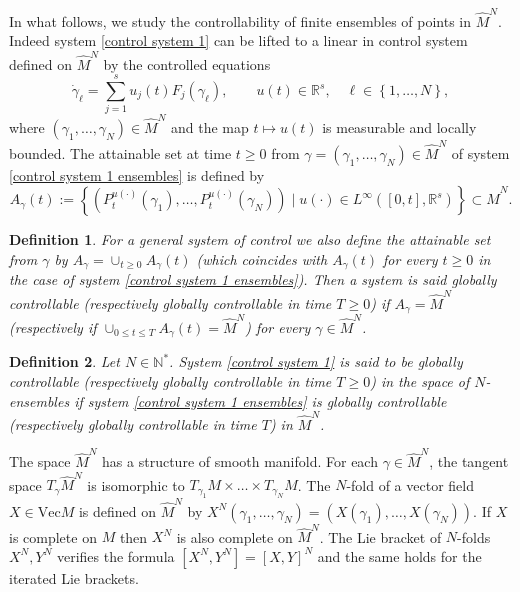 \documentclass[10pt]{article}
\newcommand{\R}{{\mathbb R}}
\newcommand{\N}{{\mathbb N}}
\newtheorem{definition}{Definition}
\begin{document}
In what follows, we study the controllability of finite ensembles of points in $\hat{M}^N$. Indeed system \eqref{control system 1} can be lifted to a linear in control system defined on $\hat{M}^N$ by the controlled equations
\begin{equation} \label{control system 1 ensembles}
    \dot{\gamma}_\ell=\sum_{j=1}^s u_j(t)F_j(\gamma_\ell), \qquad u(t)\in \R^s,\quad \ell \in \left\{1,\dots,N\right\},
\end{equation}
where $(\gamma_1,\dots,\gamma_N)\in \hat{M}^N$ and the map $t\mapsto u(t)$ is measurable and locally bounded. The attainable set at time $t\geq 0$ from $\gamma=(\gamma_1,\dots,\gamma_N) \in \hat{M}^N$ of system \eqref{control system 1 ensembles} is defined by 
\begin{equation*}
A_\gamma(t):=\left\{(P_t^{u(\cdot)}(\gamma_1),\dots,P_t^{u(\cdot)}(\gamma_N))\mid u(\cdot) \in L^\infty([0,t],\R^s)\right\} \subset \hat{M}^N.
\end{equation*}

\begin{definition}
    For a general system of control we also define the attainable set from $\gamma$ by $A_\gamma=\cup_{t\geq 0}A_\gamma(t)$ (which coincides with $A_\gamma(t)$ for every $t \geq 0$ in the case of system \eqref{control system 1 ensembles}). Then a system is said globally controllable (respectively globally controllable in time $T\geq 0$) if $A_\gamma=\hat{M}^N$ (respectively if $\cup_{0\leq t \leq T}A_\gamma(t)=\hat{M}^N$) for every $\gamma \in \hat{M}^N$.
\end{definition}
\begin{definition}
    Let $N \in \N^*$. System \eqref{control system 1} is said to be globally controllable (respectively globally controllable in time $T\geq 0$) in the space of $N$-ensembles if system \eqref{control system 1 ensembles} is globally controllable (respectively globally controllable in time $T$) in $\hat{M}^N$.
\end{definition}
The space $\hat{M}^N$ has a structure of smooth manifold. For each $\gamma \in \hat{M}^N$, the tangent space $T_\gamma \hat{M}^N$ is isomorphic to $T_{\gamma_1}M\times \dots \times T_{\gamma_N}M$. The $N$-fold of a vector field $X \in \mathrm{Vec}M$ is defined on $\hat{M}^N$ by $X^{N}(\gamma_1,\dots,\gamma_N)=(X(\gamma_1),\dots,X(\gamma_N))$. If $X$ is complete on $M$ then $X^N$ is also complete on $\hat{M}^N$. The Lie bracket of $N$-folds $X^N,Y^N$ verifies the formula $[X^N,Y^N]=[X,Y]^N$ and the same holds for the iterated Lie brackets.
\end{document}

